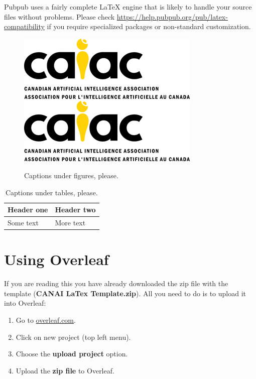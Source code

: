 \documentclass[10pt]{cai}
\begin{document}
Pubpub uses a fairly complete \LaTeX\xspace engine that is likely to handle your source files without problems. Please check \url{https://help.pubpub.org/pub/latex-compatibility} if you require specialized packages or non-standard customization.

\begin{figure}[ht]
  \centering
  \ifpdf
    \includegraphics[scale=0.6]{figs/sample_fig.png}
  \else
    \includegraphics[scale=0.6,natwidth=330,natheight=120]{figs/sample_fig.png}
  \fi
  \caption{Captions under figures, please.}
  \label{fig:sample_fig}
\end{figure}

\begin{table}[h]
\begin{tabular}{|l|l|}
\textbf{Header one} & \textbf{Header two} \\ 
\hline
 Some text & More text
\end{tabular}
\vspace{0.2cm}
\caption{Captions under tables, please.}
\label{tab:important}
\end{table}

\section{Using Overleaf}

If you are reading this you have already downloaded the zip file with the template (\textbf{CANAI \conferenceyear\xspace LaTex Template.zip}). All you need to do is to upload it into Overleaf:

\begin{enumerate}
\item Go to \url{overleaf.com}.
\item Click on new project (top left menu).
\item Choose the \textbf{upload project} option.
\item Upload the \textbf{zip file} to Overleaf.
\end{enumerate}
\end{document}
